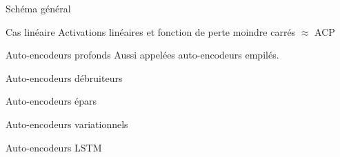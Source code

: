 \begin{frame}{Schéma général}
\end{frame}

\begin{frame}{Cas linéaire}
  Activations linéaires et fonction de perte moindre carrés $\approx$ ACP

\end{frame}

\begin{frame}{Auto-encodeurs profonds}
  Aussi appelées auto-encodeurs empilés.

\end{frame}

\begin{frame}{Auto-encodeurs débruiteurs}
\end{frame}

\begin{frame}{Auto-encodeurs épars}
\end{frame}

\begin{frame}{Auto-encodeurs variationnels}
\end{frame}

\begin{frame}{Auto-encodeurs LSTM}
\end{frame}
